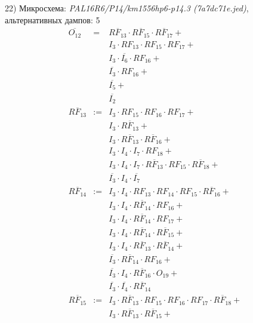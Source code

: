 \documentclass[a4paper,russian]{report}
\begin{document}
22) Микросхема: \emph{PAL16R6/P14/km1556hp6-p14.3  (7a7dc71e.jed)}, альтернативных дампов: 5
\nopagebreak\begin{eqnarray*}
    \overline{O_{12}} & = & \overline{RF_{13}} \cdotp \overline{RF_{15}} \cdotp \overline{RF_{17}} + \\
	& &  I_{3} \cdotp RF_{13} \cdotp RF_{15} \cdotp RF_{17} + \\
	& &  I_{3} \cdotp \overline{I_{6}} \cdotp RF_{16} + \\
	& &  \overline{I_{3}} \cdotp RF_{16} + \\
	& &  \overline{I_{5}} + \\
	& &  \overline{I_{2}} \\
    \overline{RF_{13}} & := & I_{3} \cdotp RF_{15} \cdotp RF_{16} \cdotp RF_{17} + \\
	& &  I_{3} \cdotp \overline{RF_{13}} + \\
	& &  I_{3} \cdotp \overline{RF_{13}} \cdotp \overline{RF_{16}} + \\
	& &  I_{3} \cdotp I_{4} \cdotp I_{7} \cdotp RF_{18} + \\
	& &  I_{3} \cdotp I_{4} \cdotp I_{7} \cdotp \overline{RF_{13}} \cdotp RF_{15} \cdotp \overline{RF_{18}} + \\
	& &  \overline{I_{3}} \cdotp I_{4} \cdotp \overline{I_{7}} \\
    \overline{RF_{14}} & := & I_{3} \cdotp I_{4} \cdotp RF_{13} \cdotp RF_{14} \cdotp RF_{15} \cdotp \overline{RF_{16}} + \\
	& &  I_{3} \cdotp I_{4} \cdotp \overline{RF_{14}} \cdotp RF_{16} + \\
	& &  I_{3} \cdotp I_{4} \cdotp \overline{RF_{14}} \cdotp RF_{17} + \\
	& &  I_{3} \cdotp I_{4} \cdotp \overline{RF_{14}} \cdotp \overline{RF_{15}} + \\
	& &  I_{3} \cdotp I_{4} \cdotp \overline{RF_{13}} \cdotp \overline{RF_{14}} + \\
	& &  \overline{I_{3}} \cdotp \overline{RF_{14}} \cdotp RF_{16} + \\
	& &  \overline{I_{3}} \cdotp I_{4} \cdotp \overline{RF_{16}} \cdotp O_{19} + \\
	& &  \overline{I_{3}} \cdotp \overline{I_{4}} \cdotp \overline{RF_{14}} \\
    \overline{RF_{15}} & := & I_{3} \cdotp \overline{RF_{13}} \cdotp RF_{15} \cdotp RF_{16} \cdotp RF_{17} \cdotp \overline{RF_{18}} + \\
	& &  I_{3} \cdotp \overline{RF_{13}} \cdotp \overline{RF_{15}} + \\

\end{eqnarray*}
\end{document}
